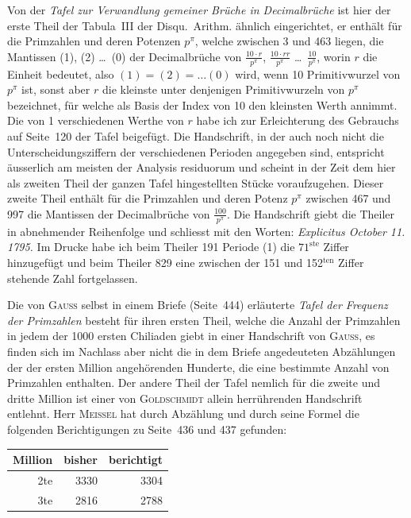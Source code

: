 \documentclass[10pt,a4paper]{article}
\begin{document}
\medskip

Von der \textit{Tafel zur Verwandlung gemeiner Br\"uche in Decimalbr\"uche} ist hier der erste Theil der Tabula~III der Disqu.~Arithm. \"ahnlich eingerichtet, er enth\"alt f\"ur die Primzahlen und deren Potenzen $p^\pi$, welche zwischen 3 und 463 liegen, die Mantissen (1), (2) \ldots\ (0) der Decimalbr\"uche von $\frac{10 \cdot r}{p^\pi}$, $\frac{10 \cdot rr}{p^\pi}$ \ldots\ $\frac{10}{p^\pi}$, worin $r$ die Einheit bedeutet, also $(1) = (2) = \ldots (0)$ wird, wenn 10 Primitivwurzel von $p^\pi$ ist, sonst aber $r$ die kleinste unter denjenigen Primitivwurzeln von $p^\pi$ bezeichnet, f\"ur welche als Basis der Index von 10 den kleinsten Werth annimmt. Die von 1 verschiedenen Werthe von $r$ habe ich zur Erleichterung des Gebrauchs auf Seite~120 der Tafel beigef\"ugt. Die Handschrift, in der auch noch nicht die Unterscheidungsziffern der verschiedenen Perioden angegeben sind, entspricht \"ausserlich am meisten der Analysis residuorum und scheint in der Zeit dem hier als zweiten Theil der ganzen Tafel hingestellten St\"ucke voraufzugehen. Dieser zweite Theil enth\"alt f\"ur die Primzahlen und deren Potenz $p^\pi$ zwischen 467 und 997 die Mantissen der Decimalbr\"uche von $\frac{100}{p^\pi}$. Die Handschrift giebt die Theiler in abnehmender Reihenfolge und schliesst mit den Worten: \textit{Explicitus October 11. 1795.} Im Drucke habe ich beim Theiler 191 Periode (1) die $71^{\text{ste}}$ Ziffer hinzugef\"ugt und beim Theiler 829 eine zwischen der 151 und 152$^{\text{ten}}$ Ziffer stehende Zahl fortgelassen.

\medskip

Die von \textsc{Gau\ss} selbst in einem Briefe (Seite~444) erl\"auterte \textit{Tafel der Frequenz der Primzahlen} besteht f\"ur ihren ersten Theil, welche die Anzahl der Primzahlen in jedem der 1000 ersten Chiliaden giebt in einer Handschrift von \textsc{Gau\ss}, es finden sich im Nachlass aber nicht die in dem Briefe angedeuteten Abz\"ahlungen der der ersten Million angeh\"orenden Hunderte, die eine bestimmte Anzahl von Primzahlen enthalten. Der andere Theil der Tafel nemlich f\"ur die zweite und dritte Million ist einer von \textsc{Goldschmidt} allein herr\"uhrenden Handschrift entlehnt. Herr \textsc{Meissel} hat durch Abz\"ahlung und durch seine Formel die folgenden Berichtigungen zu Seite~436 und 437 gefunden:

\begin{center}
\begin{tabular}{r | r r}
Million & bisher & berichtigt \\
\hline
2te & 3330 & 3304 \\
3te & 2816 & 2788 \\
\end{tabular}
\end{center}
\end{document}
